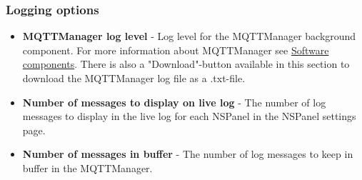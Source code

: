 \documentclass[10pt]{article}
\begin{document}
    \subsubsection{Logging options}
    \begin{itemize}
      \item \textbf{MQTTManager log level} - Log level for the MQTTManager background component. For more information about MQTTManager see \hyperref[sec:software_components]{Software components}. There is also a "Download"-button available in this section to download the MQTTManager log file as a .txt-file.
      \item \textbf{Number of messages to display on live log} - The number of log messages to display in the live log for each NSPanel in the NSPanel settings page.
      \item \textbf{Number of messages in buffer} - The number of log messages to keep in buffer in the MQTTManager.
    \end{itemize}
\end{document}
